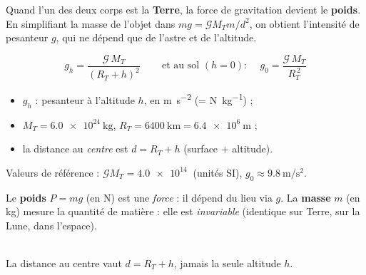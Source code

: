 \documentclass[11pt,a4paper]{article}
\newcommand{\vv}[1]{\vec{#1}}\newcommand{\ds}{\displaystyle}
\begin{document}

Quand l'un des deux corps est la \textbf{Terre}, la force de gravitation devient le
\textbf{poids}. En simplifiant la masse de l'objet dans $mg=\mathcal{G}M_T m/d^2$, on
obtient l'intensité de pesanteur $g$, qui ne dépend que de l'astre et de l'altitude.

\begin{cle}
\[
\boxed{\,g_h=\dfrac{\mathcal{G}\,M_T}{(R_T+h)^2}\,}
\qquad\text{et au sol }(h=0):\quad
\boxed{\,g_0=\dfrac{\mathcal{G}\,M_T}{R_T^{\,2}}\,}
\]
\begin{itemize}[leftmargin=1.5em,topsep=1pt,itemsep=0pt]
  \item $g_h$ : pesanteur à l'altitude $h$, en \si{\metre\per\second\squared}
        (= \si{\newton\per\kilogram}) ;
  \item $M_T=\qty{6.0e24}{\kilogram}$, $R_T=\qty{6400}{\kilo\metre}=\qty{6.4e6}{\metre}$ ;
  \item la distance au \emph{centre} est $d=R_T+h$ (surface $+$ altitude).
\end{itemize}
Valeurs de référence : $\mathcal{G}M_T=\qty{4.0e14}{}$ (unités SI), $g_0\approx\qty{9.8}{\metre\per\second\squared}$.
\end{cle}

\begin{cle}
Le \textbf{poids} $P=mg$ (en \si{\newton}) est une \emph{force} : il dépend du lieu
via $g$. La \textbf{masse} $m$ (en \si{\kilogram}) mesure la quantité de matière :
elle est \emph{invariable} (identique sur Terre, sur la Lune, dans l'espace).
\end{cle}

\begin{center}
\\[-1pt]
{\footnotesize La distance au centre vaut $d=R_T+h$, jamais la seule altitude $h$.}
\end{center}
\end{document}

